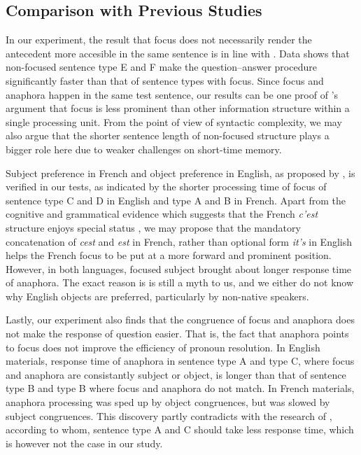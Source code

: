 \subsection{Comparison with Previous Studies}
In our experiment, the result that focus does not necessarily render the antecedent more accesible in the same sentence is in line with \citet{colonna2015}. Data shows that non-focused sentence type E and F make the question--answer procedure significantly faster than that of sentence types with focus. Since focus and anaphora happen in the same test sentence, our results can be one proof of \citet{grosz1995}'s argument that focus is less prominent than other information structure within a single processing unit. From the point of view of syntactic complexity, we may also argue that the shorter sentence length of non-focused structure plays a bigger role here due to weaker challenges on short-time memory.

Subject preference in French and object preference in English, as proposed by \citet{reichle2014}, is verified in our tests, as indicated by the shorter processing time of focus of sentence type C and D in English and type A and B in French. Apart from the cognitive and grammatical evidence which suggests that the French \emph{c'est} structure enjoys special status \citep{lambrecht2001}, we may propose that the mandatory concatenation of \emph{cest} and \emph{est} in French, rather than optional form \emph{it's} in English helps the French focus to be put at a more forward and prominent position. However, in both languages, focused subject brought about longer response time of anaphora. The exact reason is is still a myth to us, and we either do not know why English objects are preferred, particularly by non-native speakers. 

Lastly, our experiment also finds that the congruence of focus and anaphora does not make the response of question easier. That is, the fact that anaphora points to focus does not improve the efficiency of pronoun resolution. In English materials, response time of anaphora in sentence type A and type C, where focus and anaphora are consistantly subject or object, is longer than that of sentence type B and type B where focus and anaphora do not match. In French materials, anaphora processing was sped up by object congruences, but was slowed by subject congruences. This discovery partly contradicts with the research of \citet{patterson2017}, according to whom, sentence type A and C should take less response time, which is however not the case in our study.

